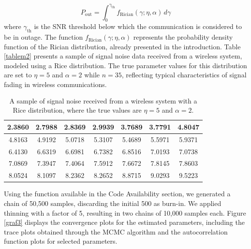 \documentclass[12pt]{interact}
\theoremstyle{plain}%
\theoremstyle{definition}
\theoremstyle{remark}
\begin{document}
\[
P_{\text{out}} = \int_0^{\gamma_{\text{th}}} f_{\text{Rician}}(\gamma; \eta, \alpha) \, d\gamma
\]
where \( \gamma_{\text{th}} \) is the SNR threshold below which the communication is considered to be in outage. The function \( f_{\text{Rician}}(\gamma; \eta, \alpha) \) represents the probability density function of the Rician distribution, already presented in the introduction. Table \ref{tablem2} presents a sample of signal noise data received from a wireless system, modeled using a Rice distribution. The true parameter values for this distribution are set to $\eta = 5$ and $\alpha = 2$ while \( n = 35 \), reflecting typical characteristics of signal fading in wireless communications.


\begin{table}[!h]
\centering
\caption{A sample of signal noise received from a wireless system with a Rice distribution, where the true values are $\eta = 5$ and $\alpha = 2$. }
\begin{tabular}{c|c|c|c|c|c|c}
\hline
2.3860 & 2.7988 & 2.8369 & 2.9939 & 3.7689 & 3.7791 & 4.8047 \\ \hline
4.8163 & 4.9192 & 5.0718 & 5.3107 & 5.4689 & 5.5971 & 5.9371 \\ \hline
6.4130 & 6.6319 & 6.6981 & 6.7382 & 6.8516 & 7.0193 & 7.0738 \\ \hline
7.0869 & 7.3947 & 7.4064 & 7.5912 & 7.6672 & 7.8145 & 7.8603 \\ \hline
8.0524 & 8.1097 & 8.2362 & 8.2652 & 8.8715 & 9.0293 & 9.5223 \\ \hline
\end{tabular}\label{table3}

\end{table}




 Using the function available in the Code Availability section, we generated a chain of 50,500 samples, discarding the initial 500 as burn-in. We applied thinning with a factor of 5, resulting in two chains of 10,000 samples each. Figure \ref{graf3} displays the convergence plots for the estimated parameters, including the trace plots obtained through the MCMC algorithm and the autocorrelation function plots for selected parameters.
\end{document}
